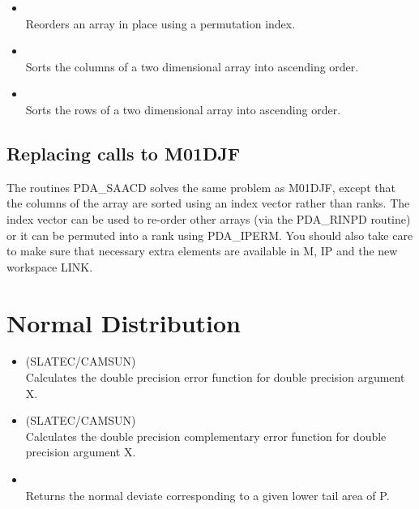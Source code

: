 \begin{itemize}
\item {}\\
   Reorders an array in place using a permutation index.

\item {}\\
   Sorts the columns of a two dimensional array into ascending order.

\item {}\\
   Sorts the rows of a two dimensional array into ascending order.

\end{itemize}

\subsection{Replacing calls to M01DJF}

The routines PDA\_SAACD solves the same problem as M01DJF, except that
the columns of the array are sorted using an index vector rather than
ranks. The index vector can be used to re-order other arrays (via the
PDA\_RINPD routine) or it can be permuted into a rank using PDA\_IPERM.
You should also take care to make sure that necessary extra elements
are available in M, IP and the new workspace LINK.


\section{Normal Distribution}

\begin{itemize}

\item {} (SLATEC/CAMSUN)\\
   Calculates the double precision error function for double
   precision argument X.
\item {} (SLATEC/CAMSUN)\\
   Calculates the double precision complementary error function
   for double precision argument X.
\item {} \\
   Returns the normal deviate corresponding to a given lower
   tail area of P.
\end{itemize}

